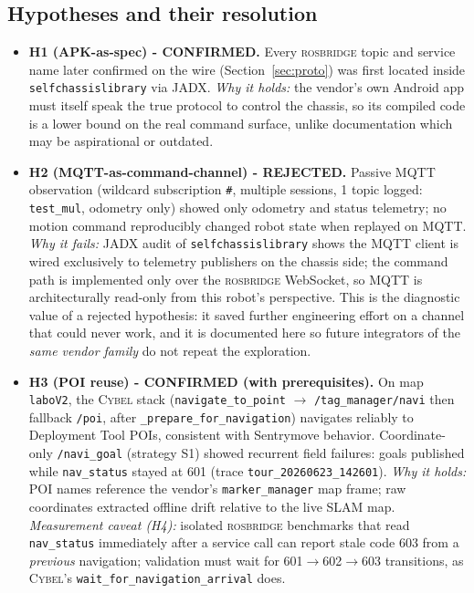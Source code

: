 \documentclass[conference]{IEEEtran}
\newcommand{\rosbridge}{\textsc{rosbridge}}
\newcommand{\cybel}{\textsc{Cybel}}
\begin{document}
\subsection{Hypotheses and their resolution}
\label{sec:hypotheses}

\begin{itemize}[leftmargin=1em]
\item \textbf{H1 (APK-as-spec) - CONFIRMED.} Every \rosbridge{} topic and service name later confirmed on the wire (Section~\ref{sec:proto}) was first located inside \texttt{selfchassislibrary} via JADX. \emph{Why it holds:} the vendor's own Android app must itself speak the true protocol to control the chassis, so its compiled code is a lower bound on the real command surface, unlike documentation which may be aspirational or outdated.
\item \textbf{H2 (MQTT-as-command-channel) - REJECTED.} Passive MQTT observation (wildcard subscription \texttt{\#}, multiple sessions, 1 topic logged: \texttt{test\_mul}, odometry only) showed only odometry and status telemetry; no motion command reproducibly changed robot state when replayed on MQTT. \emph{Why it fails:} JADX audit of \texttt{selfchassislibrary} shows the MQTT client is wired exclusively to telemetry publishers on the chassis side; the command path is implemented only over the \rosbridge{} WebSocket, so MQTT is architecturally read-only from this robot's perspective. This is the diagnostic value of a rejected hypothesis: it saved further engineering effort on a channel that could never work, and it is documented here so future integrators of the \emph{same vendor family} do not repeat the exploration.
\item \textbf{H3 (POI reuse) - CONFIRMED (with prerequisites).} On map \texttt{laboV2}, the \cybel{} stack (\texttt{navigate\_to\_point} $\rightarrow$ \texttt{/tag\_manager/navi} then fallback \texttt{/poi}, after \texttt{\_prepare\_for\_navigation}) navigates reliably to Deployment Tool POIs, consistent with Sentrymove behavior. Coordinate-only \texttt{/navi\_goal} (strategy S1) showed recurrent field failures: goals published while \texttt{nav\_status} stayed at 601 (trace \texttt{tour\_20260623\_142601}). \emph{Why it holds:} POI names reference the vendor's \texttt{marker\_manager} map frame; raw coordinates extracted offline drift relative to the live SLAM map. \emph{Measurement caveat (H4):} isolated \rosbridge{} benchmarks that read \texttt{nav\_status} immediately after a service call can report stale code 603 from a \emph{previous} navigation; validation must wait for 601$\rightarrow$602$\rightarrow$603 transitions, as \cybel{}'s \texttt{wait\_for\_navigation\_arrival} does.

\end{itemize}
\end{document}
